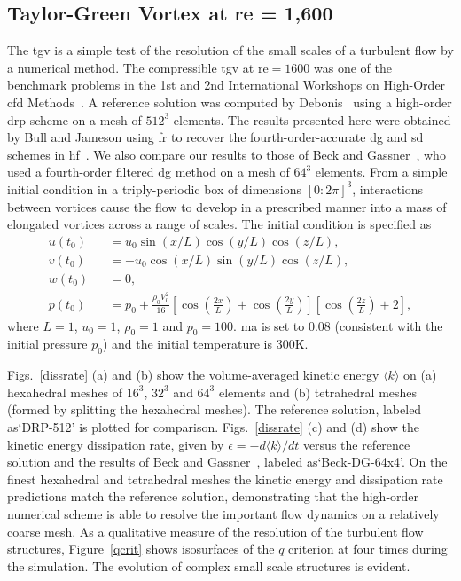 \graphicspath{{\aiaadir /figures_taylorgreen/}}%

\subsection{Taylor-Green Vortex at \gls{re} = 1,600}

The \gls{tgv} is a simple test of the resolution of the small scales of a turbulent flow by a numerical method.
The compressible \gls{tgv} at \gls{re}$=1600$ was one of the benchmark problems in the 1st and 2nd International Workshops on High-Order \gls{cfd} Methods~\cite{wang2013high}.
A reference solution was computed by Debonis~\cite{debonis:13} using a high-order \gls{drp} scheme on a mesh of $512^3$ elements.
The results presented here were obtained by Bull and Jameson using \gls{fr} to recover the fourth-order-accurate \gls{dg} and \gls{sd} schemes in \gls{hf}~\cite{bull2014a,bull2014b}.
We also compare our results to those of Beck and Gassner~\cite{beck:12}, who used a fourth-order filtered \gls{dg} method on a mesh of $64^3$ elements.
From a simple initial condition in a triply-periodic box of dimensions $[0:2\pi]^3$, interactions between vortices cause the flow to develop in a prescribed manner into a mass of elongated vortices across a range of scales.
The initial condition is specified as
%
\begin{eqnarray}\label{tgv}
u(t_0) &&= u_0 \sin (x/L) \cos (y/L) \cos (z/L), \\
v(t_0) &&= -u_0 \cos (x/L) \sin (y/L) \cos (z/L), \\
w(t_0) &&= 0, \\
p(t_0) &&= p_0 + \frac{\rho_0 V^2_0}{16} \left [ \cos \left (\frac{2x}{L} \right ) + \cos \left (\frac{2y}{L} \right ) \right ] \left [ \cos \left (\frac{2z}{L} \right ) + 2 \right ],
\end{eqnarray}
%
where $L = 1$, $u_0 = 1$, $\rho_0 = 1$ and $p_0 = 100$.
\gls{ma} is set to 0.08 (consistent with the initial pressure $p_0$) and the initial temperature is 300K.

Figs.~\ref{dissrate} (a) and (b) show the volume-averaged kinetic energy $\langle k \rangle$  on (a) hexahedral meshes of $16^3$, $32^3$ and $64^3$ elements and (b) tetrahedral meshes (formed by splitting the hexahedral meshes).
The reference solution, labeled as`DRP-512' is plotted for comparison.
Figs.~\ref{dissrate} (c) and (d) show the kinetic energy dissipation rate, given by $\epsilon = -d \langle k \rangle/dt$ versus the reference solution and the results of Beck and Gassner~\cite{beck:12}, labeled as`Beck-DG-64x4'.
On the finest hexahedral and tetrahedral meshes the kinetic energy and dissipation rate predictions match the reference solution, demonstrating that the high-order numerical scheme is able to resolve the important flow dynamics on a relatively coarse mesh.
As a qualitative measure of the resolution of the turbulent flow structures, Figure~\ref{qcrit} shows isosurfaces of the $q$ criterion at four times during the simulation.
The evolution of complex small scale structures is evident.

